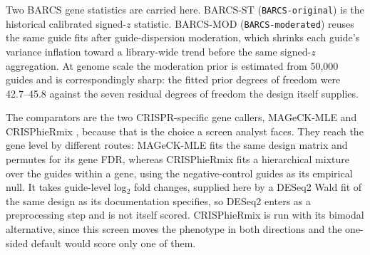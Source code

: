 Two BARCS gene statistics are carried here.  BARCS-ST
(\texttt{BARCS-original}) is the historical calibrated signed-$z$ statistic.
BARCS-MOD (\texttt{BARCS-moderated}) reuses the same guide fits after
guide-dispersion moderation, which shrinks each guide's variance inflation
toward a library-wide trend before the same signed-$z$ aggregation.  At
genome scale the moderation prior is estimated from 50,000 guides and is
correspondingly sharp: the fitted prior degrees of freedom were 42.7--45.8
against the seven residual degrees of freedom the design itself supplies.

The comparators are the two CRISPR-specific gene callers, MAGeCK-MLE and
CRISPhieRmix \citep{daley2018crisphiermix}, because that is the choice a
screen analyst faces.  They reach the gene level by different routes:
MAGeCK-MLE fits the same design matrix and permutes for its gene FDR, whereas
CRISPhieRmix fits a hierarchical mixture over the guides within a gene, using
the negative-control guides as its empirical null.  It takes guide-level
log$_2$ fold changes, supplied here by a DESeq2 Wald fit of the same design as
its documentation specifies, so DESeq2 enters as a preprocessing step and is
not itself scored.  CRISPhieRmix is run with its bimodal alternative, since
this screen moves the phenotype in both directions and the one-sided default
would score only one of them.

